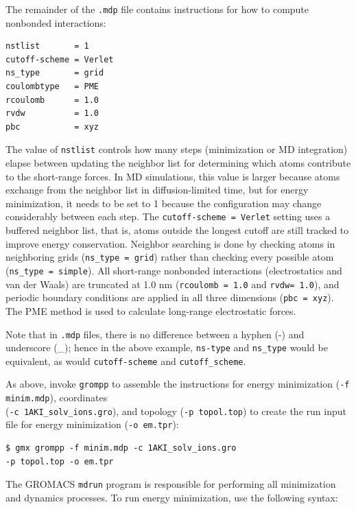 \documentclass[9pt,tutorial]{livecoms}
\begin{document}
The remainder of the \texttt{.mdp} file contains instructions for how to compute nonbonded interactions:

\begin{verbatim}
nstlist       = 1
cutoff-scheme = Verlet
ns_type       = grid
coulombtype   = PME
rcoulomb      = 1.0
rvdw          = 1.0
pbc           = xyz
\end{verbatim}

The value of \texttt{nstlist} controls how many steps (minimization or MD integration) elapse between updating the neighbor list for determining which atoms contribute to the short-range forces. In MD simulations, this value is larger because atoms exchange from the neighbor list in diffusion-limited time, but for energy minimization, it needs to be set to 1 because the configuration may change considerably between each step. The \texttt{cutoff-scheme = Verlet} setting uses a buffered neighbor list, that is, atoms outside the longest cutoff are still tracked to improve energy conservation. Neighbor searching is done by checking atoms in neighboring grids (\texttt{ns\_type = grid}) rather than checking every possible atom (\texttt{ns\_type = simple}). All short-range nonbonded interactions (electrostatics and van der Waals) are truncated at 1.0 nm (\texttt{rcoulomb = 1.0} and \texttt{rvdw= 1.0}), and periodic boundary conditions are applied in all three dimensions (\texttt{pbc = xyz}). The PME method is used to calculate long-range electrostatic forces.

Note that in \texttt{.mdp} files, there is no difference between a hyphen (-) and underscore (\_); hence in the above example, \texttt{ns-type} and \texttt{ns\_type} would be equivalent, as would \texttt{cutoff-scheme} and \texttt{cutoff\_scheme}.

As above, invoke \texttt{grompp} to assemble the instructions for energy minimization (\texttt{-f minim.mdp}), coordinates \\(\texttt{-c 1AKI\_solv\_ions.gro}), and topology (\texttt{-p topol.top}) to create the run input file for energy minimization (\texttt{-o em.tpr}):

\begin{verbatim}
$ gmx grompp -f minim.mdp -c 1AKI_solv_ions.gro 
-p topol.top -o em.tpr
\end{verbatim}

The GROMACS \texttt{mdrun} program is responsible for performing all minimization and dynamics processes. To run energy minimization, use the following syntax:
\end{document}

